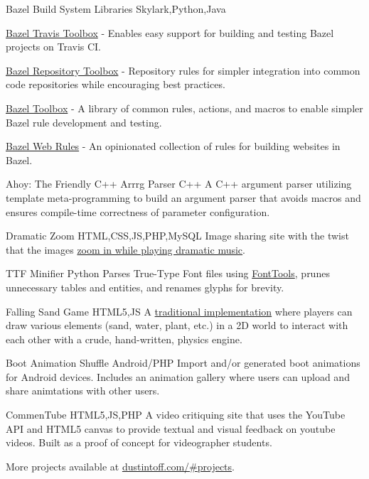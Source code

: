 \personalProject {} {Bazel Build System Libraries} {Skylark,Python,Java} {
    \begin {minimalItemize}
        \item \href {https://github.com/quittle/bazel_travis_toolbox} {Bazel Travis Toolbox} - Enables easy support for building and testing Bazel projects on Travis CI.
        \item \href {https://github.com/quittle/bazel_repository_toolbox} {Bazel Repository Toolbox} - Repository rules for simpler integration into common code repositories while encouraging best practices.
        \item \href {https://github.com/quittle/bazel_toolbox} {Bazel Toolbox} - A library of common rules, actions, and macros to enable simpler Bazel rule development and testing.
        \item \href {https://github.com/quittle/rules_web} {Bazel Web Rules} - An opinionated collection of rules for building websites in Bazel.
    \end {minimalItemize}
}

 {Ahoy: The Friendly C++ Arrrg Parser} {C++} {
    A C++ argument parser utilizing template meta-programming to build an argument parser that avoids macros and ensures compile-time correctness of parameter configuration.
}

 {Dramatic Zoom} {HTML,CSS,JS,PHP,MySQL} {
    Image sharing site with the twist that the images \href {https://youtu.be/a1Y73sPHKxw} {zoom in while playing dramatic music}.
}

\personalProject {} {TTF Minifier} {Python} {
    Parses True-Type Font files using \href {https://github.com/fonttools/fonttools} {FontTools}, prunes unnecessary tables and entities, and renames glyphs for brevity.
}

 {Falling Sand Game} {HTML5,JS} {
    A \href {https://en.wikipedia.org/wiki/Falling-sand_game} {traditional implementation} where players can draw various elements (sand, water, plant, etc.) in a 2D world to interact with each other with a crude, hand-written, physics engine.
}

 {Boot Animation Shuffle} {Android/PHP} {
    Import and/or generated boot animations for Android devices. Includes an animation gallery where users can upload and share animtations with other users.
}

 {CommenTube} {HTML5,JS,PHP} {
    A video critiquing site that uses the YouTube API and HTML5 canvas to provide textual and visual feedback on youtube videos. Built as a proof of concept for videographer students.
}

More projects available at {\color {slateblue} \href {http://dustintoff.com/\#projects} {dustintoff.com/\#projects}}.